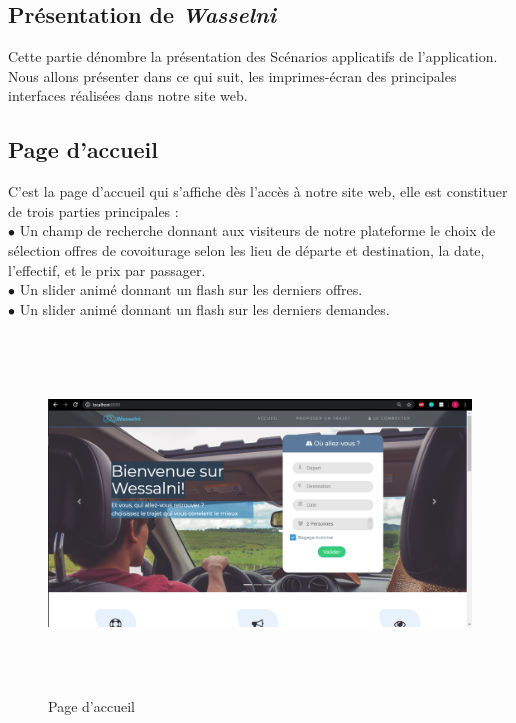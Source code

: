 \documentclass[a4paper]{report}
\begin{document}
\begin{spacing}{2}
\section{Présentation de \textit{Wasselni}}
Cette partie dénombre la présentation des Scénarios applicatifs de l’application. Nous allons présenter dans ce qui suit, les imprimes-écran des principales interfaces réalisées dans notre site web.
\subsection{Page d'accueil}
C’est la page d’accueil qui s’affiche dès l’accès à notre site web, elle est constituer de trois parties principales :\\
$\bullet$ Un champ de recherche donnant aux visiteurs de notre plateforme le choix de sélection offres de covoiturage selon les lieu de départe et destination, la date, l'effectif, et le prix par passager.\\
$\bullet$ Un slider animé donnant un flash sur les derniers offres.\\
$\bullet$ Un slider animé donnant un flash sur les derniers demandes.\\ 
\begin{figure}[!ht]
\begin{center}
\includegraphics[height=9.5cm]{accueil1.png}
\end{center}
\caption[Page d'accueil]{Page d'accueil}
\end{figure}
\begin{figure}[!ht]
\begin{center}

\end{center}
\end{figure}
\end{spacing}
\end{document}
